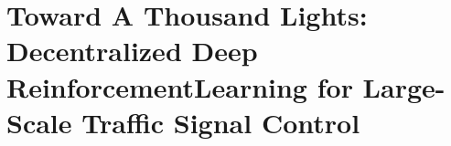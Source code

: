 \chapter{Toward A Thousand Lights: Decentralized Deep ReinforcementLearning for Large-Scale Traffic Signal Control}
\label{chap:thousand}